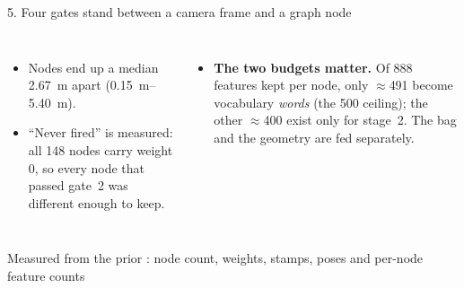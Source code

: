 \documentclass[11pt,aspectratio=169]{beamer}
\newcommand{\repo}[1]{\texttt{\detokenize{#1}}}
\newcommand{\src}[1]{\vfill{\tiny\color{black!55}#1}}
\begin{document}
\begin{frame}{5. Four gates stand between a camera frame and a graph node}
\begin{columns}[T]
\begin{itemize}
        \item Nodes end up a median \SI{2.67}{\metre} apart
              (\SIrange{0.15}{5.40}{\metre}).
        \item ``Never fired'' is measured: all 148 nodes carry weight 0, so
              every node that passed gate~2 was different enough to keep.
      \end{itemize}
      \small
      \begin{itemize}
        \item \textbf{The two budgets matter.} Of 888 features kept per node,
              only $\approx$491 become vocabulary \emph{words} (the 500
              ceiling); the other $\approx$400 exist only for stage~2. The bag
              and the geometry are fed separately.
      \end{itemize}
  \end{columns}
  \src{Measured from the prior \repo{.db}: node count, weights, stamps, poses and per-node feature counts}
\end{frame}
\end{document}
